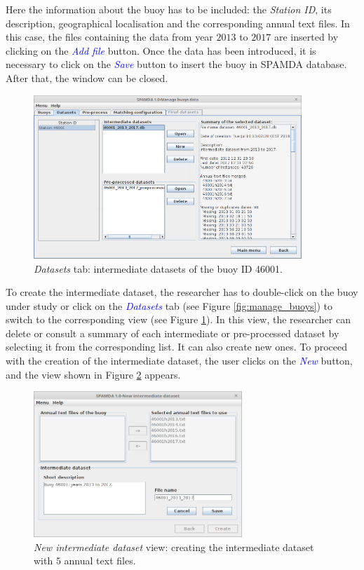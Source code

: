 \documentclass[energies,article,submit,moreauthors,pdftex]{Definitions/mdpi}
\begin{document}
			Here the information about the buoy has to be included: the \textit{Station ID}, its description, geographical localisation and the corresponding annual text files. In this case, the files containing the data from year $2013$ to $2017$ are inserted by clicking on the \textcolor{blue}{\textit{Add file}} button. Once the data has been introduced, it is necessary to click on the \textcolor{blue}{\textit{Save}} button to insert the buoy in SPAMDA database. After that, the window can be closed.  
		
			\begin{figure}[ht!]
				\centering
				\includegraphics[width=0.90\textwidth]{figures/FigureDatasets.png}
				\caption{\textit{Datasets} tab: intermediate datasets of the buoy ID 46001.}\label{fig:show_datasets}
			\end{figure}
			
			To create the intermediate dataset, the researcher has to double-click on the buoy under study or click on the \textcolor{blue}{\textit{Datasets}} tab (see Figure \ref{fig:manage_buoys}) to switch to the corresponding view (see Figure \ref{fig:show_datasets}). In this view, the researcher can delete or consult a summary of each intermediate or pre-processed dataset by selecting it from the corresponding list. It can also create new ones. To proceed with the creation of the intermediate dataset, the user clicks on the \textcolor{blue}{\textit{New}} button, and the view shown in Figure \ref{fig:intermediate} appears. 
			
			\begin{figure}[ht!]
				\centering
				\includegraphics[width=0.70\textwidth]{figures/FigureNew_intermediate_dataset.png}
				\caption{\textit{New intermediate dataset} view: creating the intermediate dataset with $5$ annual text files.}\label{fig:intermediate}
			\end{figure}
			
\end{document}
